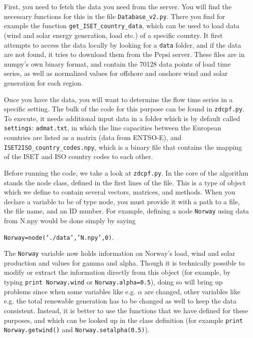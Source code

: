 \documentclass[english,twoside,a4paper,11pt]{article}
\numberwithin{equation}{section}
\begin{document}
First, you need to fetch the data you need from the server. You will
find the necessary functions for this in the file
\texttt{Database\_v2.py}. There you find for example the function 
\texttt{get\_ISET\_country\_data}, which can be used to load data
(wind and solar energy generation, load etc.) of a specific
country. It first attempts to access the data locally by looking for a
\texttt{data} folder, and if the data are not found, it tries to
download them from the Pepsi server. These files are in numpy's own
binary format, and contain the 70128 data points of load time series,
as well as normalized values for offshore and onshore wind and solar
generation for each region.

Once you have the data, you will want to determine the flow time series
in a specific setting. The bulk of the code for this purpose can be
found in \texttt{zdcpf.py}. To execute, it needs additional input data
in a folder which is by default called \texttt{settings}:
\texttt{admat.txt}, in which the line capacities 
between the European countries are listed as a matrix (data from
ENTSO-E), and \texttt{ISET2ISO\_country\_codes.npy}, which is a binary
file that contains the mapping of the ISET and ISO country codes to
each other.

Before running the code, we take a look at \texttt{zdcpf.py}. In the
core of the algorithm stands the node class, defined in the first
lines of the file. This is a type of object which we define
to contain several vectors, matrices, and methods. When you declare a
variable to be of type node, you must provide it with a path to a
file, the file name, and an ID number. For example, defining a node
\texttt{Norway} using data from N.npy would be done simply by saying

\noindent
\texttt{Norway=node('./data','N.npy',0)}. 

The \texttt{Norway} variable now holds
information on Norway's load, wind and solar production and values for
gamma and alpha. Though it is technically possible to modify or
extract the information directly from this object (for example, by
typing \texttt{print Norway.wind} or \texttt{Norway.alpha=0.5}), doing so will
bring up problems since when some variables like e.g. $\alpha$ are
changed, other variables like e.g. the total renewable generation has
to be changed as well to keep the 
data consistent. Instead, it is better to use the
functions that we have defined for these purposes, and which can be
looked up in the class definition (for example \texttt{print
  Norway.getwind()} and \texttt{Norway.setalpha(0.5)}).
\end{document}
